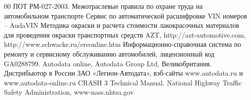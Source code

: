 \begin {thebibliography}{00}
ПОТ РМ-027-2003. Межотраслевые правила по охране труда на автомобильном транспорте
Сервис по автоматической расшифровке VIN номеров – AudaVIN
Методика окраски и расчета стоимости лакокрасочных материалов для проведения окраски транспортных средств   AZT, http://azt-automotive.com,   http://www.schwacke.ru/ereonline.htm
Информационно-справочная система по ремонту и сервисному обслуживанию автомобилей, лицензионный код GA0288799. Autodata online,  Autodata Group Ltd, Великобритания. Дистрибьютор в России ЗАО «Легион-Автодата», вэб-сайты www.autodata.ru и www.autodata-online.ru
CRASH 3 Technical Manual. National Highway Traffic Safety Administration, www-nass.nhtsa.gov

\end{thebibliography}
